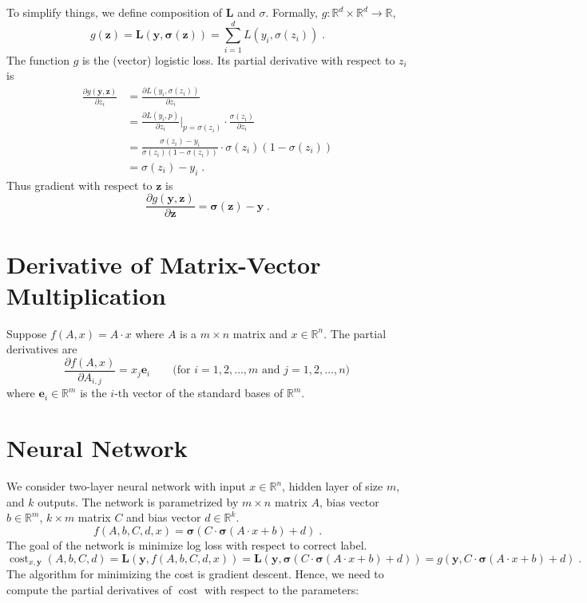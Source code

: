 \documentclass[12pt]{article}
\DeclareMathOperator{\cost}{cost}
\newcommand{\R}{\mathbb{R}}
\newcommand{\bsigma}{\pmb{\sigma}}
\newcommand{\y}{\mathbf{y}}
\newcommand{\z}{\mathbf{z}}
\newcommand{\e}{\mathbf{e}}
\renewcommand{\L}{\mathbf{L}}
\begin{document}
To simplify things, we define composition of $\L$ and $\sigma$.
Formally, $g:\R^d \times \R^d \to \R$,
$$
g(\z) = \L(\y, \bsigma(\z)) = \sum_{i=1}^d L(y_i, \sigma(z_i)) \; .
$$
The function $g$ is the (vector) logistic loss.
Its partial derivative with respect to $z_i$ is
\begin{align*}
\frac{\partial g(\y, \z)}{\partial z_i}
& = \frac{\partial L(y_i, \sigma(z_i))}{\partial z_i} \\
& = \frac{\partial L(y_i, p)}{\partial z_i} \bigg|_{p=\sigma(z_i)} \cdot \frac{\sigma(z_i)}{\partial z_i} \\
& = \frac{\sigma(z_i) - y_i}{\sigma(z_i)(1-\sigma(z_i))} \cdot  \sigma(z_i) (1 - \sigma(z_i)) \\
& =  \sigma(z_i) - y_i \; .
\end{align*}
Thus gradient with respect to $\z$ is
$$
\frac{\partial g(\y, \z)}{\partial \z} = \bsigma(\z) - \y  \; .
$$

\section{Derivative of Matrix-Vector Multiplication}

Suppose $f(A,x) = A \cdot x$ where $A$ is a $m \times n$ matrix and $x \in \R^n$.
The partial derivatives are
$$
\frac{\partial f(A,x)}{\partial A_{i,j}} = x_j \e_i \qquad \text{(for $i=1,2,\dots,m$ and $j=1,2,\dots,n$)} \,
$$
where $\e_i \in \R^m$ is the $i$-th vector of the standard bases of $\R^m$.

\section{Neural Network}

We consider two-layer neural network with input $x \in \R^n$, hidden layer of size $m$, and $k$ outputs.
The network is parametrized by $m \times n$ matrix $A$, bias vector $b \in \R^m$, $k \times m$ matrix $C$ and bias vector $d \in \R^k$.
$$
f(A,b,C,d,x) = \bsigma(C \cdot \bsigma(A \cdot x + b) + d) \; .
$$
The goal of the network is minimize log loss with respect to correct label.
$$
\cost_{x,\y}(A,b,C,d) = \L(\y, f(A,b,C,d,x)) = \L(\y, \bsigma(C \cdot \bsigma(A \cdot x + b) + d)) = g(\y, C \cdot \bsigma(A \cdot x + b) + d) \; .
$$
The algorithm for minimizing the cost is gradient descent. Hence, we need to
compute the partial derivatives of $\cost$ with respect to the parameters:
\end{document}
